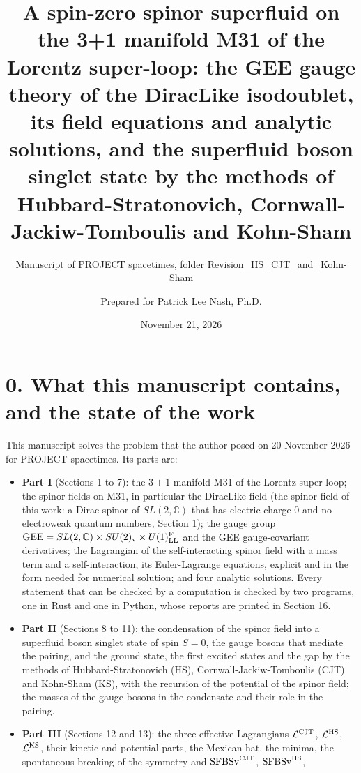 \documentclass[
  10pt,
]{article}
\title{A spin-zero spinor superfluid on the 3+1 manifold M31 of the
Lorentz super-loop: the GEE gauge theory of the DiracLike isodoublet,
its field equations and analytic solutions, and the superfluid boson
singlet state by the methods of Hubbard-Stratonovich,
Cornwall-Jackiw-Tomboulis and Kohn-Sham}
\subtitle{Manuscript of PROJECT spacetimes, folder
Revision\_HS\_CJT\_and\_Kohn-Sham}
\author{Prepared for Patrick Lee Nash, Ph.D.}
\date{November 21, 2026}
\providecommand{\tightlist}{%
  \setlength{\itemsep}{0pt}\setlength{\parskip}{0pt}}
\begin{document}
\maketitle

\hypertarget{what-this-manuscript-contains-and-the-state-of-the-work}{%
\section{0. What this manuscript contains, and the state of the
work}\label{what-this-manuscript-contains-and-the-state-of-the-work}}

This manuscript solves the problem that the author posed on 20 November
2026 for PROJECT spacetimes. Its parts are:

\begin{itemize}
\tightlist
\item
  \textbf{Part I} (Sections 1 to 7): the \(3+1\) manifold M31 of the
  Lorentz super-loop; the spinor fields on M31, in particular the
  DiracLike field (the spinor field of this work: a Dirac spinor of
  \(SL(2,\mathbb C)\) that has electric charge 0 and no electroweak
  quantum numbers, Section 1); the gauge group
  \(\mathrm{GEE}=SL(2,\mathbb C)\times SU(2)_{\rm v}\times U(1)^{\rm F}_{\rm LL}\)
  and the GEE gauge-covariant derivatives; the Lagrangian of the
  self-interacting spinor field with a mass term and a self-interaction,
  its Euler-Lagrange equations, explicit and in the form needed for
  numerical solution; and four analytic solutions. Every statement that
  can be checked by a computation is checked by two programs, one in
  Rust and one in Python, whose reports are printed in Section 16.
\item
  \textbf{Part II} (Sections 8 to 11): the condensation of the spinor
  field into a superfluid boson singlet state of spin \(S=0\), the gauge
  bosons that mediate the pairing, and the ground state, the first
  excited states and the gap by the methods of Hubbard-Stratonovich
  (HS), Cornwall-Jackiw-Tomboulis (CJT) and Kohn-Sham (KS), with the
  recursion of the potential of the spinor field; the masses of the
  gauge bosons in the condensate and their role in the pairing.
\item
  \textbf{Part III} (Sections 12 and 13): the three effective
  Lagrangians \(\mathcal L^{\rm CJT}\), \(\mathcal L^{\rm HS}\),
  \(\mathcal L^{\rm KS}\), their kinetic and potential parts, the
  Mexican hat, the minima, the spontaneous breaking of the symmetry and
  \(\mathrm{SFBSv}^{\rm CJT}\), \(\mathrm{SFBSv}^{\rm HS}\),

\end{itemize}
\end{document}
